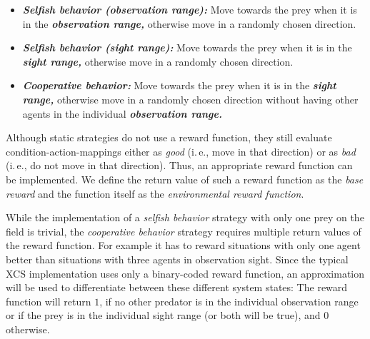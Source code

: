 \begin{itemize}
	\item \emph{\textbf{Selfish behavior (observation range):}} Move towards the prey when it is in the \emph{\textbf{observation range,}} otherwise move in a randomly chosen direction.
	\item \emph{\textbf{Selfish behavior (sight range):}} Move towards the prey when it is in the \emph{\textbf{sight range,}} otherwise move in a randomly chosen direction.
	\item \emph{\textbf{Cooperative behavior:}} Move towards the prey when it is in the \emph{\textbf{sight range,}} otherwise move in a randomly chosen direction without having other agents in the individual \emph{\textbf{observation range.}}
\end{itemize}

Although static strategies do not use a reward function, they still evaluate condition-action-mappings either as \emph{good} (i.\,e., move in that direction) or as \emph{bad} (i.\,e., do not move in that direction). Thus, an appropriate reward function can be implemented. We define the return value of such a reward function as the \emph{base reward} and the function itself as the \emph{environmental reward function}.

While the implementation of a \emph{selfish behavior} strategy with only one prey on the field is trivial, the \emph{cooperative behavior} strategy requires multiple return values of the reward function. For example it has to reward situations with only one agent better than situations with three agents in observation sight. Since the typical XCS implementation \cite{BW02} uses only a binary-coded reward function, an approximation will be used to differentiate between these different system states: The reward function will return $1$, if no other predator is in the individual observation range or if the prey is in the individual sight range (or both will be true), and $0$ otherwise. 



